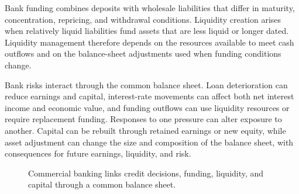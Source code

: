 Bank funding combines deposits with wholesale liabilities that differ in maturity, concentration, repricing, and withdrawal conditions. Liquidity creation arises when relatively liquid liabilities fund assets that are less liquid or longer dated. Liquidity management therefore depends on the resources available to meet cash outflows and on the balance-sheet adjustments used when funding conditions change.

Bank risks interact through the common balance sheet. Loan deterioration can reduce earnings and capital, interest-rate movements can affect both net interest income and economic value, and funding outflows can use liquidity resources or require replacement funding. Responses to one pressure can alter exposure to another. Capital can be rebuilt through retained earnings or new equity, while asset adjustment can change the size and composition of the balance sheet, with consequences for future earnings, liquidity, and risk.



\begin{figure}[H]
\centering
{}
\caption*{Commercial banking links credit decisions, funding, liquidity, and capital through a common balance sheet.}
\end{figure}

